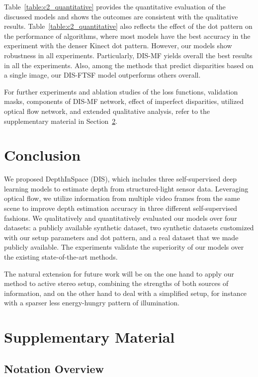 Table~\ref{table:c2_quantitative} provides the quantitative evaluation of the discussed models and shows the outcomes are consistent with the qualitative results. Table~\ref{table:c2_quantitative} also reflects the effect of the dot pattern on the performance of algorithms, where most models have the best accuracy in the experiment with the denser Kinect dot pattern. However, our models show robustness in all experiments. Particularly, DIS-MF yields overall the best results in all the experiments. Also, among the methods that predict disparities based on a single image, our DIS-FTSF model outperforms others overall.

For further experiments and ablation studies of the loss functions, validation masks, components of DIS-MF network, effect of imperfect disparities, utilized optical flow network, and extended qualitative analysis, refer to the supplementary material in Section~\ref{sec:c2_supp}.

\section{Conclusion}

We proposed DepthInSpace (DIS), which includes three self-supervised deep learning models to estimate depth from structured-light sensor data. Leveraging optical flow, we utilize information from multiple video frames from the same scene to improve depth estimation accuracy in three different self-supervised fashions. We qualitatively and quantitatively evaluated our models over four datasets: a publicly available synthetic dataset, two synthetic datasets customized with our setup parameters and dot pattern, and a real dataset that we made publicly available. The experiments validate the superiority of our models over the existing state-of-the-art methods.

The natural extension for future work will be on the one hand to apply our method to active stereo setup, combining the strengths of both sources of information, and on the other hand to deal with a simplified setup, for instance with a sparser less energy-hungry pattern of illumination.

\section{Supplementary Material} \label{sec:c2_supp}

\subsection{Notation Overview}

